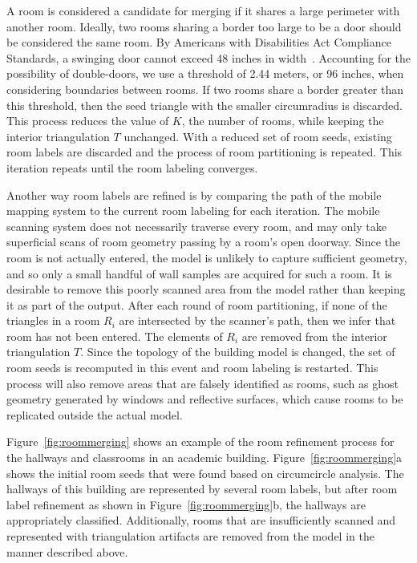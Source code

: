 \documentclass[12pt,onecolumn,oneside]{book}
\begin{document}
A room is considered a candidate for merging if it shares a large perimeter with another room.  Ideally, two rooms sharing a border too large to be a door should be considered the same room.  By Americans with Disabilities Act Compliance Standards, a swinging door cannot exceed 48 inches in width~\cite{ADACompliance}.  Accounting for the possibility of double-doors, we use a threshold of 2.44 meters, or 96 inches, when considering boundaries between rooms.  If two rooms share a border greater than this threshold, then the seed triangle with the smaller circumradius is discarded.  This process reduces the value of $K$, the number of rooms, while keeping the interior triangulation $T$ unchanged.  With a reduced set of room seeds, existing room labels are discarded and the process of room partitioning is repeated.  This iteration repeats until the room labeling converges.

Another way room labels are refined is by comparing the path of the mobile mapping system to the current room labeling for each iteration.  The mobile scanning system does not necessarily traverse every room, and may only take superficial scans of room geometry passing by a room's open doorway.  Since the room is not actually entered, the model is unlikely to capture sufficient geometry, and so only a small handful of wall samples are acquired for such a room.  It is desirable to remove this poorly scanned area from the model rather than keeping it as part of the output.  After each round of room partitioning, if none of the triangles in a room $R_i$ are intersected by the scanner's path, then we infer that room has not been entered.  The elements of $R_i$ are removed from the interior triangulation $T$.  Since the topology of the building model is changed, the set of room seeds is recomputed in this event and room labeling is restarted.  This process will also remove areas that are falsely identified as rooms, such as ghost geometry generated by windows and reflective surfaces, which cause rooms to be replicated outside the actual model.

Figure~\ref{fig:roommerging} shows an example of the room refinement process for the hallways and classrooms in an academic building. Figure~\ref{fig:roommerging}a shows the initial room seeds that were found based on circumcircle analysis.  The hallways of this building are represented by several room labels, but after room label refinement as shown in Figure~\ref{fig:roommerging}b, the hallways are appropriately classified.  Additionally, rooms that are insufficiently scanned and represented with triangulation artifacts are removed from the model in the manner described above.
\end{document}
